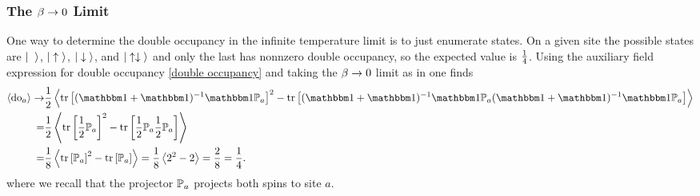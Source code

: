 \subsubsection{The $\beta\rightarrow0$ Limit}

One way to determine the double occupancy in the infinite temperature limit is to just enumerate states.
On a given site the possible states are $\ket{\null}$, $\left|\;\uparrow\;\right\rangle$, $\left|\;\downarrow\;\right\rangle$, and $\left|\;\uparrow\downarrow\;\right\rangle$ and only the last has nonnzero double occupancy, so the expected value is $\frac{1}{4}$.
Using the auxiliary field expression for double occupancy \eqref{double occupancy} and taking the $\beta\rightarrow0$ limit as in  one finds
\begin{align}
    \expectation{\doubleOccupancy_a}
    \goesto&
    \half\expectation{\tr{(\one + \one)\inverse \one \PP_a}^2 - \tr{(\one+\one)\inverse \one \PP_a (\one+\one)\inverse \one \PP_a}}
    \nonumber\\
    =&
    \half\expectation{\tr{\oneover{2} \PP_a}^2 - \tr{\oneover{2} \PP_a \oneover{2} \PP_a}}
    \nonumber\\
    =&
    \oneover{8}\expectation{\tr{\PP_a}^2 - \tr{\PP_a}}
    =
    \oneover{8}\expectation{ 2^2 - 2 } = \frac{2}{8} = \frac{1}{4}.
\end{align}
where we recall that the projector $\mathbb{P}_a$ projects both spins to site $a$.

